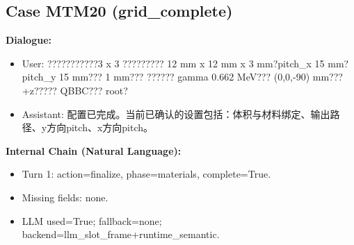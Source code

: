 \documentclass[11pt]{ctexart}
\begin{document}
\subsection{Case MTM20 (grid\_complete)}
\textbf{Dialogue:}
\begin{itemize}
\item User: ???????????3 x 3 ????????? 12 mm x 12 mm x 3 mm?pitch\_x 15 mm?pitch\_y 15 mm??? 1 mm??? ?????? gamma 0.662 MeV??? (0,0,-90) mm??? +z????? QBBC??? root?
\item Assistant: 配置已完成。当前已确认的设置包括：体积与材料绑定、输出路径、y方向pitch、x方向pitch。
\end{itemize}
\textbf{Internal Chain (Natural Language):}
\begin{itemize}
\item Turn 1: action=finalize, phase=materials, complete=True.
\item Missing fields: none.
\item LLM used=True; fallback=none; backend=llm\_slot\_frame+runtime\_semantic.
\end{itemize}
\end{document}
